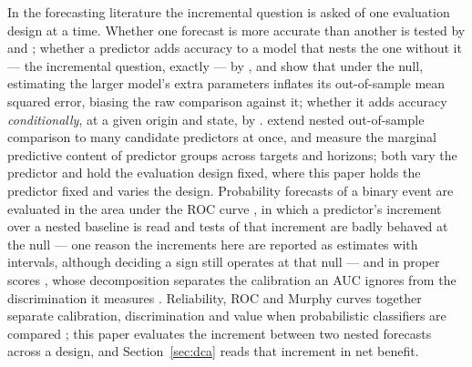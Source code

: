 In the forecasting literature the incremental question is asked of one
evaluation design at a time. Whether one forecast is more accurate than
another is tested by \citet{diebold1995comparing} and
\citet{west1996asymptotic}; whether a predictor adds accuracy to a model that
nests the one without it --- the incremental question, exactly --- by
\citet{clark2001nested}, and \citet{clark2007approximately} show that under
the null, estimating the larger model's extra parameters inflates its
out-of-sample mean squared error, biasing the raw comparison against it;
whether it adds accuracy \emph{conditionally}, at a given origin and state,
by \citet{giacomini2006conditional}. \citet{gonzalo2024outofsample} extend
nested out-of-sample comparison to many candidate predictors at once, and
\citet{liu2024marginal} measure the marginal predictive content of predictor
groups across targets and horizons; both vary the predictor and hold the
evaluation design fixed, where this paper holds the predictor fixed and
varies the design. Probability forecasts of a binary event are evaluated in
the area under the ROC curve \citep{lahiri2013evaluating}, in which a
predictor's increment over a nested baseline is read
\citep{liu2016recessions} and tests of that increment are badly behaved at
the null \citep{demler2012misuse,pepe2013testing} --- one reason the
increments here are reported as estimates with intervals, although deciding
a sign still operates at that null --- and in proper scores
\citep{brier1950verification,gneiting2007scoring}, whose decomposition
separates the calibration an AUC ignores from the discrimination it measures
\citep{dimitriadis2021stable}. Reliability, ROC and Murphy curves together
separate calibration, discrimination and value when probabilistic
classifiers are compared \citep{dimitriadis2024triptych}; this paper evaluates the
increment between two nested forecasts across a design, and
Section~\ref{sec:dca} reads that increment in net benefit.

